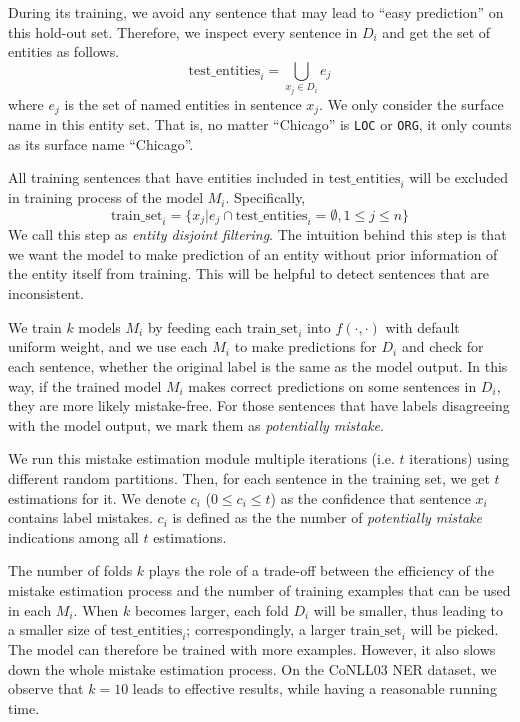 \documentclass[11pt,a4paper]{article}
\begin{document}
        During its training, we avoid any sentence that may lead to ``easy prediction'' on this hold-out set. 
        Therefore, we inspect every sentence in $D_i$ and get the set of entities as follows.
        \begin{equation}
        \label{eq:test_entities}
            \mbox{test\_entities}_i = \bigcup_{x_j \in D_i} e_{j}
        \end{equation}
        where $e_j$ is the set of named entities in sentence $x_j$.
        We only consider the surface name in this entity set. 
        That is, no matter ``Chicago'' is \texttt{LOC} or \texttt{ORG}, it only counts as its surface name ``Chicago''.
        
        All training sentences that have entities included in $\mbox{test\_entities}_i$ will be excluded in training process of the model $M_i$.
        Specifically,
        \begin{equation}
        \label{eq:train_set}
            \mbox{train\_set}_i = \{ x_j | e_j \cap \mbox{test\_entities}_i = \emptyset, 1 \leq j \leq n \}
        \end{equation}
        We call this step as \textit{entity disjoint filtering}. 
        The intuition behind this step is that we want the model to make prediction of an entity without prior information of the entity itself from training. 
        This will be helpful to detect sentences that are inconsistent.
        
        We train $k$ models $M_i$ by feeding each $\mbox{train\_set}_i$ into $f(\cdot, \cdot)$ with default uniform weight, and we use each $M_i$ to make predictions for $D_i$ and check for each sentence, whether the original label is the same as the model output. 
        In this way, if the trained model $M_i$ makes correct predictions on some sentences in $D_i$, they are more likely mistake-free.
        For those sentences that have labels disagreeing with the model output, we mark them as \textit{potentially mistake}. 
        
        We run this mistake estimation module multiple iterations (i.e. $t$ iterations) using different random partitions.
        Then, for each sentence in the training set, we get $t$ estimations for it. 
        We denote $c_i$ ($0 \le c_i \le t$) as the confidence that sentence $x_i$ contains label mistakes.
        $c_i$ is defined as the the number of \textit{potentially mistake} indications among all $t$ estimations.

        The number of folds $k$ plays the role of a trade-off between the efficiency of the mistake estimation process and the number of training examples that can be used in each $M_i$.
        When $k$ becomes larger, each fold $D_i$ will be smaller, thus leading to a smaller size of $\mbox{test\_entities}_i$;
        correspondingly, a larger $\mbox{train\_set}_i$ will be picked.
        The model can therefore be trained with more examples. 
        However, it also slows down the whole mistake estimation process.
        On the CoNLL03 NER dataset, we observe that $k = 10$ leads to effective results, while having a reasonable running time.
    
\end{document}
